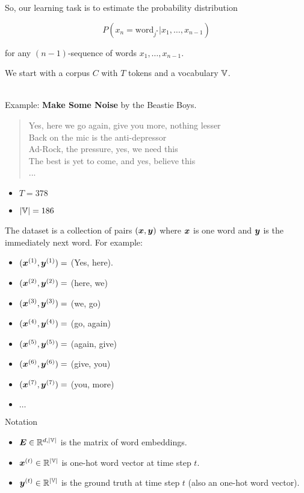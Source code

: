 So, our learning task is to estimate the probability distribution 

\[
P(x_{n} = \text{word}_{j^{*}} | x_{1}, \dots ,x_{n-1})
\]

for any $(n-1)$-sequence of words $x_{1}, \dots ,x_{n-1}$.

We start with a corpus $C$ with $T$ tokens and a vocabulary $\mathbb{V}$.\\\

Example: \textbf{Make Some Noise} by the Beastie Boys.\\

\begin{quote}
Yes, here we go again, give you more, nothing lesser\\
Back on the mic is the anti-depressor\\
Ad-Rock, the pressure, yes, we need this\\
The best is yet to come, and yes, believe this\\
... \\
\end{quote}

\begin{itemize}
\item $T = 378$
\item $|\mathbb{V}| = 186$
\end{itemize}


The dataset is a collection of pairs $(\bm{x},\bm{y})$ where $\bm{x}$ is one word and $\bm{y}$ is the immediately next word. For example:
\begin{itemize}
\item [] $(\bm{x}^{(1)}, \bm{y}^{(1)}) =$ (Yes, here).
\item [] $(\bm{x}^{(2)}, \bm{y}^{(2)}) =$ (here, we)
\item [] $(\bm{x}^{(3)}, \bm{y}^{(3)}) =$ (we, go)
\item [] $(\bm{x}^{(4)}, \bm{y}^{(4)}) =$ (go, again)
\item [] $(\bm{x}^{(5)}, \bm{y}^{(5)}) =$ (again, give)
\item [] $(\bm{x}^{(6)}, \bm{y}^{(6)}) =$ (give, you)
\item [] $(\bm{x}^{(7)}, \bm{y}^{(7)}) =$ (you, more)
\item [] $\dots$
\end{itemize}

Notation

\begin{itemize}
\item $\bm{E} \in \mathbb{R}^{d,|\mathbb{V}|}$ is the matrix of word embeddings.
\vspace{0.3cm}
\item $\bm{x}^{(t)} \in \mathbb{R}^{|\mathbb{V}|}$ is one-hot word vector at time step $t$.
\vspace{0.3cm}
\item $\bm{y}^{(t)} \in \mathbb{R}^{|\mathbb{V}|}$ is the ground truth at time step $t$ (also an one-hot word vector).
\end{itemize}


